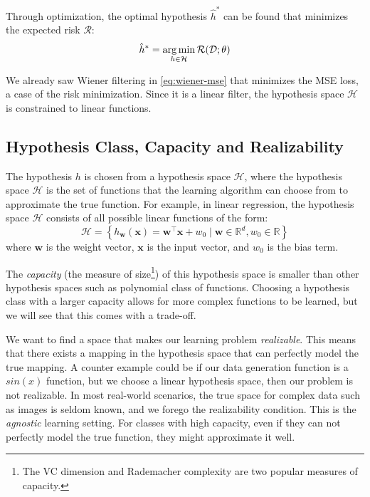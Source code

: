 Through optimization, the optimal hypothesis $\hat{h}^*$ can be found that minimizes the expected risk $\mathcal{R}$:
\begin{equation}
    \hat{h}^* = \operatorname*{arg\,min}_{h \in \mathcal{H}} \mathcal{R}(\mathcal{D}; \theta)
\end{equation}

We already saw Wiener filtering in \cref{eq:wiener-mse} that minimizes the \gls{MSE} loss, a case of the risk minimization. Since it is a linear filter, the hypothesis space $\mathcal{H}$ is constrained to linear functions.

\subsection{Hypothesis Class, Capacity and Realizability}
The hypothesis $h$ is chosen from a hypothesis space $\mathcal{H}$, where the hypothesis space $\mathcal{H}$ is the set of functions that the learning algorithm can choose from to approximate the true function. 
For example, in linear regression, the hypothesis space $\mathcal{H}$ consists of all possible linear functions of the form:
\begin{equation}\label{eq:linear-hypothesis}
   \mathcal{H} =  \left\{ h_{\mathbf{w}}(\mathbf{x}) = \mathbf{w}^\top \mathbf{x} + w_0 \mid \mathbf{w} \in \mathbb{R}^d, w_0 \in \mathbb{R} \right\}
\end{equation}
where $\mathbf{w}$ is the weight vector, $\mathbf{x}$ is the input vector, and $w_0$ is the bias term.

The \textit{capacity} (the measure of size\footnote{The VC dimension and Rademacher complexity are two popular measures of capacity.}) of this hypothesis space is smaller than other hypothesis spaces such as polynomial class of functions. Choosing a hypothesis class with a larger capacity allows for more complex functions to be learned, but we will see that this comes with a trade-off.

We want to find a space that makes our learning problem \textit{realizable}. This means that there exists a mapping in the hypothesis space that can perfectly model the true mapping. A counter example could be if our data generation function is a $sin(x)$ function, but we choose a linear hypothesis space, then our problem is not realizable. In most real-world scenarios, the true space for complex data such as images is seldom known, and we forego the realizability condition. This is the \textit{agnostic} learning setting. For classes with high capacity, even if they can not perfectly model the true function, they might approximate it well.


